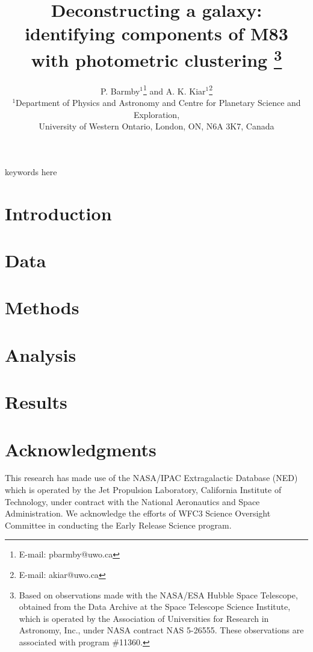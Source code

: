 \documentclass[useAMS,usenatbib]{mn2e}
\title[Deconstructing M83]{Deconstructing a galaxy: identifying components of M83 with photometric clustering%
\footnote{  
Based on observations made with the NASA/ESA Hubble Space Telescope, obtained from the Data Archive at the Space Telescope Science Institute, which is operated by the Association of Universities for Research in Astronomy, Inc., under NASA contract NAS 5-26555. These observations are associated with program \#11360.
}
}
\author[Kiar \& Barmby \& Kiar]
{
P. Barmby$^{1}$\thanks{E-mail: pbarmby@uwo.ca} and 
A. K. Kiar$^{1}$\thanks{E-mail: akiar@uwo.ca}\\
$^{1}$Department of Physics and Astronomy and Centre for Planetary Science and Exploration,\\
University of Western Ontario, London, ON, N6A 3K7, Canada\\
}
\begin{document}
\date{}


\maketitle
\label{firstpage}

\begin{abstract}

\end{abstract}

\begin{keywords}
keywords here
\end{keywords}

\section{Introduction}

\section{Data}

\section{Methods}

\section{Analysis}

\section{Results}


%
%
%


\section*{Acknowledgments}

This research has made use of the NASA/IPAC Extragalactic Database (NED) which is operated by the Jet Propulsion Laboratory,
California Institute of Technology, under contract with the National Aeronautics and Space Administration. 
We acknowledge the efforts of WFC3 Science Oversight Committee in conducting the Early Release Science program.


{}

\bsp



\appendix

\label{lastpage}
\end{document}
